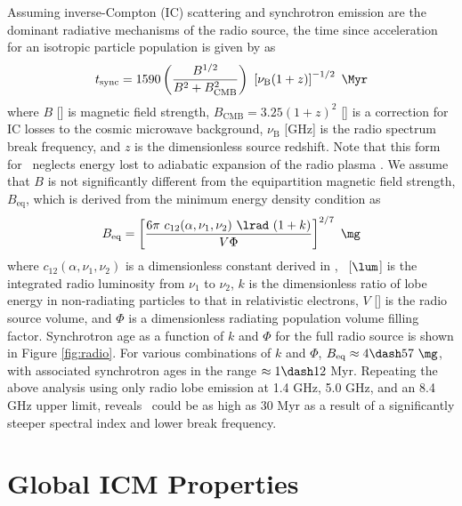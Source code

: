 \documentclass[useAMS,usenatbib]{mn2e}
\begin{document}
Assuming inverse-Compton (IC) scattering and synchrotron emission are
the dominant radiative mechanisms of the radio source, the time since
acceleration for an isotropic particle population is given by
\citet{2001AJ....122.1172S} as
\begin{equation}
  \tsync = 1590 \left(\frac{B^{1/2}}{B^2 + B_{\mathrm{CMB}}^2}\right)~
  \left[\nu_{\mathrm{B}} (1+z)\right]^{-1/2} ~\Myr
\end{equation}
where $B$ [\mg] is magnetic field strength, $B_{\mathrm{CMB}} =
3.25(1+z)^2$ [\mg] is a correction for IC losses to the cosmic
microwave background, $\nu_{\mathrm{B}}$ [GHz] is the radio spectrum
break frequency, and $z$ is the dimensionless source redshift. Note
that this form for \tsync\ neglects energy lost to adiabatic expansion
of the radio plasma \citep{1968ARA&A...6..321S}. We assume that $B$ is
not significantly different from the equipartition magnetic field
strength, $B_{\mathrm{eq}}$, which is derived from the minimum energy
density condition as \citep{1980ARA&A..18..165M}
\begin{equation}
  B_{\mathrm{eq}} = \left[\frac{6 \pi ~c_{12}(\alpha,\nu_1, \nu_2)
      ~\lrad ~(1+k)}{V \Phi}\right]^{2/7} ~\mathrm{\mg}
\end{equation}
where $c_{12}(\alpha,\nu_1,\nu_2)$ is a dimensionless constant derived
in \citet{pach}, \lrad\ [$\lum$] is the integrated radio luminosity
from $\nu_1$ to $\nu_2$, $k$ is the dimensionless ratio of lobe energy
in non-radiating particles to that in relativistic electrons, $V$
[\cc] is the radio source volume, and $\Phi$ is a dimensionless
radiating population volume filling factor. Synchrotron age as a
function of $k$ and $\Phi$ for the full radio source is shown in
Figure \ref{fig:radio}. For various combinations of $k$ and $\Phi$,
$B_{\mathrm{eq}} \approx 4 \dash 57 ~\mg$, with associated synchrotron
ages in the range $\approx 1 \dash 12$ Myr. Repeating the above
analysis using only radio lobe emission at 1.4 GHz, 5.0 GHz, and an
8.4 GHz upper limit, reveals \tsync\ could be as high as $30$ Myr as a
result of a significantly steeper spectral index and lower break
frequency.

\section{Global ICM Properties}
\label{sec:global}
\end{document}
